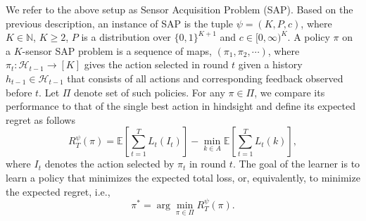 We refer to the above setup as Sensor Acquisition Problem (SAP).
Based on the previous description, an instance of SAP is the tuple $\psi = (K,P,c)$, where $K\in \mathbb{N}$, $K\ge 2$,
$P$ is a distribution over $\{0,1\}^{K+1}$ and $c\in [0,\infty)^K$. 
 A policy $\pi$ on a $K$-sensor SAP problem
 is a sequence of maps, $(\pi_1, \pi_2, \cdots)$, where
 $\pi_t : \mathcal{H}_{t-1}\rightarrow [K]$ gives the action selected in round $t$
 given a history $h_{t-1}\in \mathcal{H}_{t-1}$ that consists of all actions and corresponding feedback observed before $t$. 
 Let $\Pi$ denote set of such policies. 
 For any $\pi \in \Pi$, we compare its performance to that of the single best action in hindsight 
 and define its expected regret as follows
\begin{equation}
R^\psi_T(\pi)= \mathbb{E}\left[\sum_{t=1}^T L_t(I_t)\right]-\min_{k\in A}\mathbb{E}\left[\sum_{t=1}^T L_t(k)\right],
\end{equation}
where $I_t$ denotes the action selected by $\pi_t$ in round $t$.
The goal of the learner is to learn a policy that minimizes the expected total loss, or, equivalently, to minimize the expected regret, i.e.,
\begin{equation}
\pi^*= \arg \min_{\pi \in \Pi } R^\psi_T(\pi).
\end{equation}

